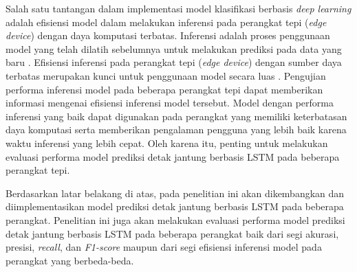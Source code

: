 Salah satu tantangan dalam implementasi model klasifikasi berbasis \textit{deep learning} adalah efisiensi model dalam melakukan inferensi pada perangkat tepi (\textit{edge device}) dengan daya komputasi terbatas.
Inferensi adalah proses penggunaan model yang telah dilatih sebelumnya untuk melakukan prediksi pada data yang baru \parencite{AIInferenceVs}.
Efisiensi inferensi pada perangkat tepi (\textit{edge device}) dengan sumber daya terbatas merupakan kunci untuk penggunaan model secara luas \parencite{ulkerReviewingInferencePerformance2020}.
Pengujian performa inferensi model pada beberapa perangkat tepi dapat memberikan informasi mengenai efisiensi inferensi model tersebut.
Model dengan performa inferensi yang baik dapat digunakan pada perangkat yang memiliki keterbatasan daya komputasi serta memberikan pengalaman pengguna yang lebih baik karena waktu inferensi yang lebih cepat.
Oleh karena itu, penting untuk melakukan evaluasi performa model prediksi detak jantung berbasis LSTM pada beberapa perangkat tepi.

Berdasarkan latar belakang di atas, pada penelitian ini akan dikembangkan dan diimplementasikan model prediksi detak jantung berbasis LSTM pada beberapa perangkat.
Penelitian ini juga akan melakukan evaluasi performa model prediksi detak jantung berbasis LSTM pada beberapa perangkat baik dari segi akurasi, presisi, \emph{recall}, dan \emph{F1-score} maupun dari segi efisiensi inferensi model pada perangkat yang berbeda-beda.





